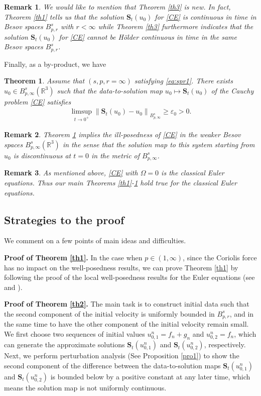 \documentclass[12pt]{article}
\newtheorem{theorem}{Theorem}[section]
\newtheorem{remark}{Remark}[section]
\newcommand{\bbal}{\begin{align*}}
\newcommand{\ep}{\varepsilon}
\newcommand{\R}{\mathbb{R}}
\newcommand{\f}{\left}
\newcommand{\g}{\right}
\begin{document}
\begin{remark}
We would like to mention that Theorem \ref{th3} is new. In fact, Theorem \ref{th1} tells us that the solution $\mathbf{S}_{t}(u_0)$  for \eqref{CE} is continuous in time
in Besov spaces $B^s_{p,r}$ with $r<\infty$ while Theorem \ref{th3} furthermore indicates that the solution $\mathbf{S}_{t}(u_0)$  for \eqref{CE} cannot be H\"{o}lder continuous in time in the same Besov spaces $B^s_{p,r}$.
\end{remark}

Finally, as a by-product, we have
\begin{theorem}\label{th4}
Assume that $(s,p,r=\infty)$ satisfying \eqref{eq:spr1}. There exists $u_0\in B^s_{p,\infty}(\R^3)$  such that the data-to-solution map $u_0\mapsto \mathbf{S}_{t}(u_0)$ of the Cauchy problem \eqref{CE} satisfies
\bbal
\limsup_{t\to0^+}\f\|\mathbf{S}_t(u_0)-u_0\g\|_{B^s_{p,\infty}}\geq \ep_0>0.
\end{align*}
\end{theorem}

\begin{remark}
Theorem \ref{th4} implies the ill-posedness of \eqref{CE} in the weaker Besov spaces $B^s_{p,\infty}(\R^3)$ in the sense that the solution map to this system starting from $u_0$ is discontinuous at $t = 0$ in the metric of $B^s_{p,\infty}$.
\end{remark}

\begin{remark}
As mentioned above, \eqref{CE} with $\Omega=0$ is the classical Euler equations. Thus our main Theorems \ref{th1}-\ref{th4} hold true for the classical Euler equations.
\end{remark}

\subsection{Strategies to the proof}


We comment on a few points of main ideas and difficulties.

{\bf Proof of Theorem \ref{th1}.} In the case when $p\in(1,\infty)$, since the Coriolis force has no impact on the well-posedness results, we can prove Theorem \ref{th1} by following the proof of the local well-posedness results for the Euler equations (see \cite[Theorem 7.1 ]{B} and \cite[Theorem 1.1 ]{GLY}).


{\bf Proof of Theorem \ref{th2}.} The main task is to construct initial
data such that the second component of the initial velocity is uniformly bounded in $B^s_{p,r}$, and in the same time to have the other component of the initial velocity remain small. We first choose two sequences of initial values $u^n_{0,1}=f_n+g_n$ and $u^n_{0,2}=f_n$, which can generate the approximate solutions $\mathbf{S}_t(u^n_{0,1})$ and $\mathbf{S}_t(u^n_{0,2})$, respectively. Next, we perform perturbation analysis (See Proposition \ref{pro1}) to show the second component of the  difference between the data-to-solution maps $\mathbf{S}_t(u^n_{0,1})$ and $\mathbf{S}_t(u^n_{0,2})$ is bounded below by a positive constant at any later time,  which means the solution map is not uniformly continuous.
\end{document}
